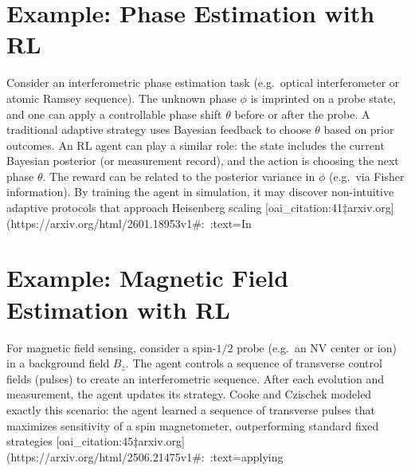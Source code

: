 \documentclass[12pt]{article}
\begin{document}
\section{Example: Phase Estimation with RL}
Consider an interferometric phase estimation task (e.g.\ optical interferometer or atomic Ramsey sequence).  The unknown phase $\phi$ is imprinted on a probe state, and one can apply a controllable phase shift $\theta$ before or after the probe.  A traditional adaptive strategy uses Bayesian feedback to choose $\theta$ based on prior outcomes.  An RL agent can play a similar role: the state includes the current Bayesian posterior (or measurement record), and the action is choosing the next phase $\theta$.  The reward can be related to the posterior variance in $\phi$ (e.g.\ via Fisher information).  By training the agent in simulation, it may discover non-intuitive adaptive protocols that approach Heisenberg scaling [oai_citation:41‡arxiv.org](https://arxiv.org/html/2601.18953v1#:~:text=In%

\section{Example: Magnetic Field Estimation with RL}
For magnetic field sensing, consider a spin-$1/2$ probe (e.g.\ an NV center or ion) in a background field $B_z$.  The agent controls a sequence of transverse control fields (pulses) to create an interferometric sequence.  After each evolution and measurement, the agent updates its strategy.  Cooke and Czischek modeled exactly this scenario: the agent learned a sequence of transverse pulses that maximizes sensitivity of a spin magnetometer, outperforming standard fixed strategies [oai_citation:45‡arxiv.org](https://arxiv.org/html/2506.21475v1#:~:text=applying%
\end{document}
